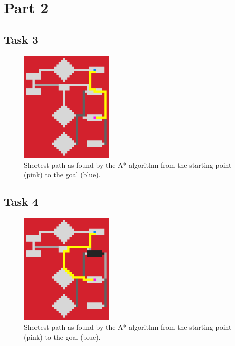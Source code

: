 \newpage

\section*{Part 2}

\subsection*{Task 3}
\begin{figure}[h!]
    \centering
    \includegraphics[width=0.4\textwidth]{"../Images/task_3.png"}
    \caption{Shortest path as found by the A* algorithm from the starting point (pink) to the goal (blue).}
\end{figure}

\subsection*{Task 4}
\begin{figure}[h!]
    \centering
    \includegraphics[width=0.4\textwidth]{"../Images/task_4.png"}
    \caption{Shortest path as found by the A* algorithm from the starting point (pink) to the goal (blue).}
\end{figure}

\newpage

